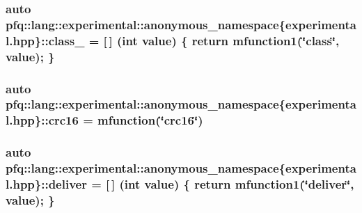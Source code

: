 \hypertarget{namespacepfq_1_1lang_1_1experimental_1_1anonymous__namespace_02experimental_8hpp_03_a55ce0b220b42a47460d1d40d3d5fdd5d}{
\subsubsection[{class\+\_\+}]{\setlength{\rightskip}{0pt plus 5cm}auto pfq\+::lang\+::experimental\+::anonymous\+\_\+namespace\{experimental.\+hpp\}\+::class\+\_\+ = \mbox{[}$\,$\mbox{]} (int value) \{ return {\bf mfunction1}(\char`\"{}class\char`\"{}, value); \}}}\label{namespacepfq_1_1lang_1_1experimental_1_1anonymous__namespace_02experimental_8hpp_03_a55ce0b220b42a47460d1d40d3d5fdd5d}
\hypertarget{namespacepfq_1_1lang_1_1experimental_1_1anonymous__namespace_02experimental_8hpp_03_a8152d34c5c69cc26aaa2b4a14ed37af1}{
\subsubsection[{crc16}]{\setlength{\rightskip}{0pt plus 5cm}auto pfq\+::lang\+::experimental\+::anonymous\+\_\+namespace\{experimental.\+hpp\}\+::crc16 = {\bf mfunction}(\char`\"{}crc16\char`\"{})}}\label{namespacepfq_1_1lang_1_1experimental_1_1anonymous__namespace_02experimental_8hpp_03_a8152d34c5c69cc26aaa2b4a14ed37af1}
\hypertarget{namespacepfq_1_1lang_1_1experimental_1_1anonymous__namespace_02experimental_8hpp_03_aabd600ebf1ee62184fa0765f49f9f990}{
\subsubsection[{deliver}]{\setlength{\rightskip}{0pt plus 5cm}auto pfq\+::lang\+::experimental\+::anonymous\+\_\+namespace\{experimental.\+hpp\}\+::deliver = \mbox{[}$\,$\mbox{]} (int value) \{ return {\bf mfunction1}(\char`\"{}deliver\char`\"{}, value); \}}}\label{namespacepfq_1_1lang_1_1experimental_1_1anonymous__namespace_02experimental_8hpp_03_aabd600ebf1ee62184fa0765f49f9f990}
